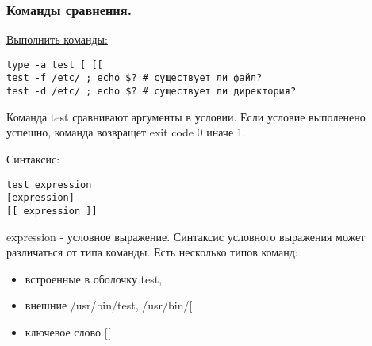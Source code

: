 \begin{frame}[fragile]
   \frametitle{Команды сравнения.}

\underline{Выполнить команды:}
	\small\begin{lstlisting}
type -a test [ [[
test -f /etc/ ; echo $? # существует ли файл?
test -d /etc/ ; echo $? # существует ли директория?
\end{lstlisting}

\pause
\alert{Команда test} сравнивают аргументы в условии. Если условие выполенено успешно, команда возвращет exit code \alert{0} иначе \alert{1}.

Синтаксис:
\begin{verbatim}
test expression 
[expression] 
[[ expression ]]
\end{verbatim}
expression - условное выражение. Синтаксис условного выражения может различаться от типа команды.
Есть несколько типов команд:

\begin{itemize}
    \item встроенные в оболочку test, [
    \item внешние /usr/bin/test, /usr/bin/[
    \item ключевое слово [[
\end{itemize}


\end{frame}
